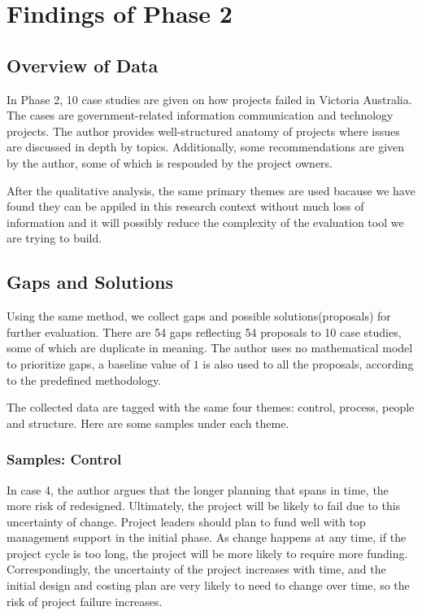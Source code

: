 
\section{Findings of Phase 2}

\subsection{Overview of Data}
In Phase 2, 10 case studies are given on how projects failed in Victoria Australia. The cases are government-related information communication and technology projects. The author\parencite{case_study} provides well-structured anatomy of projects where issues are discussed in depth by topics. Additionally, some recommendations are given by the author, some of which is responded by the project owners.

After the qualitative analysis, the same primary themes are used bacause we have found they can be appiled in this research context without much loss of information and it will possibly reduce the complexity of the evaluation tool we are trying to build. 

\subsection{Gaps and Solutions}
Using the same method, we collect gaps and possible solutions(proposals) for further evaluation. There are 54 gaps reflecting 54 proposals to 10 case studies, some of which are duplicate in meaning. The author uses no mathematical model to prioritize gaps, a baseline value of $1$ is also used to all the proposals, according to the predefined methodology.

The collected data are tagged with the same four themes: control, process, people and structure. Here are some samples under each theme.

\subsubsection{Samples: Control}
In case 4, the author argues that the longer planning that spans in time, the more risk of redesigned. Ultimately, the project will be likely to fail due to this uncertainty of change. Project leaders should plan to fund well with top management support in the initial phase. As change happens at any time, if the project cycle is too long, the project will be more likely to require more funding. Correspondingly, the uncertainty of the project increases with time, and the initial design and costing plan are very likely to need to change over time, so the risk of project failure increases.


